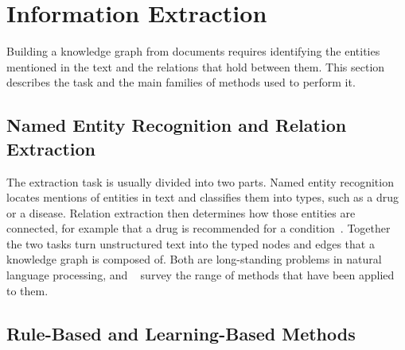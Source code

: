 \section{Information Extraction}
\label{sec:bg-ie}

Building a knowledge graph from documents requires identifying the entities
mentioned in the text and the relations that hold between them. This section
describes the task and the main families of methods used to perform it.

\subsection{Named Entity Recognition and Relation Extraction}
\label{sec:bg-ie-ner}

The extraction task is usually divided into two parts. Named entity
recognition locates mentions of entities in text and classifies them into
types, such as a drug or a disease. Relation extraction then determines how
those entities are connected, for example that a drug is recommended for a
condition~\cite{nasar2021}. Together the two tasks turn unstructured text into
the typed nodes and edges that a knowledge graph is composed of. Both are
long-standing problems in natural language processing, and ~\cite{nasar2021} survey the range of methods that have been applied to
them.

\subsection{Rule-Based and Learning-Based Methods}
\label{sec:bg-ie-methods}


